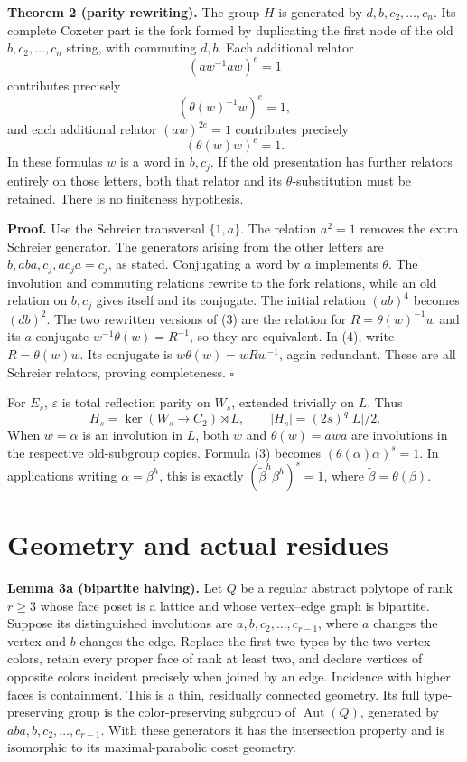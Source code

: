 \textbf{Theorem 2 (parity rewriting).} The group \(H\) is generated by \(d,b,c_2,\ldots,c_n\). Its complete Coxeter part is the fork formed by duplicating the first node of the old \(b,c_2,\ldots,c_n\) string, with commuting \(d,b\). Each additional relator
\[
 (a w^{-1}a w)^e=1
\]
contributes precisely
\[
 (\theta(w)^{-1}w)^e=1,                         \tag{3}
\]
and each additional relator \((aw)^{2e}=1\) contributes precisely
\[
 (\theta(w)w)^e=1.                             \tag{4}
\]
In these formulas \(w\) is a word in \(b,c_j\). If the old presentation has further relators entirely on those letters, both that relator and its \(\theta\)-substitution must be retained. There is no finiteness hypothesis.

\textbf{Proof.} Use the Schreier transversal \(\{1,a\}\). The relation \(a^2=1\) removes the extra Schreier generator. The generators arising from the other letters are \(b,aba,c_j,ac_ja=c_j\), as stated. Conjugating a word by \(a\) implements \(\theta\). The involution and commuting relations rewrite to the fork relations, while an old relation on \(b,c_j\) gives itself and its conjugate. The initial relation \((ab)^4\) becomes \((db)^2\). The two rewritten versions of (3) are the relation for \(R=\theta(w)^{-1}w\) and its \(a\)-conjugate \(w^{-1}\theta(w)=R^{-1}\), so they are equivalent. In (4), write \(R=\theta(w)w\). Its conjugate is \(w\theta(w)=wRw^{-1}\), again redundant. These are all Schreier relators, proving completeness. $\square$

For \(E_s\), \(\varepsilon\) is total reflection parity on \(W_s\), extended trivially on \(L\). Thus
\[
 H_s=\ker(W_s\longrightarrow C_2)\rtimes L,
 \qquad |H_s|=(2s)^q|L|/2.                    \tag{5}
\]
When \(w=\alpha\) is an involution in \(L\), both \(w\) and \(\theta(w)=awa\) are involutions in the respective old-subgroup copies. Formula (3) becomes \((\theta(\alpha)\alpha)^s=1\). In applications writing \(\alpha=\beta^h\), this is exactly \((\widetilde\beta^h\beta^h)^s=1\), where \(\widetilde\beta=\theta(\beta)\).

\section{Geometry and actual residues}\label{geometry-and-actual-residues}

\textbf{Lemma 3a (bipartite halving).}
Let $Q$ be a regular abstract polytope of rank $r\ge3$ whose face poset is a lattice and whose vertex--edge graph is bipartite. Suppose its distinguished involutions are $a,b,c_2,\ldots,c_{r-1}$, where $a$ changes the vertex and $b$ changes the edge. Replace the first two types by the two vertex colors, retain every proper face of rank at least two, and declare vertices of opposite colors incident precisely when joined by an edge. Incidence with higher faces is containment. This is a thin, residually connected geometry. Its full type-preserving group is the color-preserving subgroup of $\operatorname{Aut}(Q)$, generated by $aba,b,c_2,\ldots,c_{r-1}$. With these generators it has the intersection property and is isomorphic to its maximal-parabolic coset geometry.

